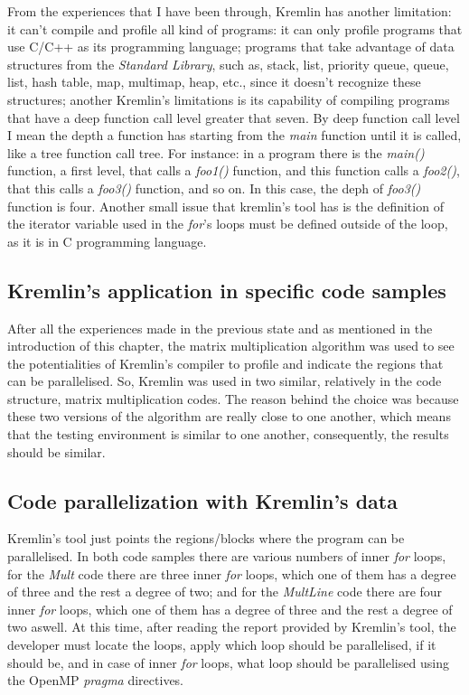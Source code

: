 From the experiences that I have been through, Kremlin has another limitation: it can't compile and profile all kind of programs: it can only profile programs that use C/C++ as its programming language; programs that take advantage of data structures from the \textit{Standard Library}, such as, stack, list, priority queue, queue, list, hash table, map, multimap, heap, etc., since it doesn't recognize these structures; another Kremlin's limitations is its capability of compiling programs that have a deep function call level greater that seven. By deep function call level I mean the depth a function has starting from the \textit{main} function until it is called, like a tree function call tree. For instance: in a program there is the \textit{main()} function, a first level, that calls a \textit{foo1()} function, and this function calls a \textit{foo2()}, that this calls a \textit{foo3()} function, and so on. In this case, the deph of \textit{foo3()} function is four. Another small issue that kremlin's tool has is the definition of the iterator variable used in the \textit{for}'s loops must be defined outside of the loop, as it is in C programming language.


\subsection{Kremlin's application in specific code samples}

After all the experiences made in the previous state and as mentioned in the introduction of this chapter, the matrix multiplication algorithm was used to see the potentialities of Kremlin's compiler to profile and indicate the regions that can be parallelised. So, Kremlin was used in two similar, relatively in the code structure, matrix multiplication codes. The reason behind the choice was because these two versions of the algorithm are really close to one another, which means that the testing environment is similar to one another, consequently, the results should be similar. 

\subsection{Code parallelization with Kremlin's data}

Kremlin's tool just points the regions/blocks where the program can be parallelised. In both code samples there are various numbers of inner \textit{for} loops, for the \textit{Mult} code  there are three inner \textit{for} loops, which one of them has a degree of three and the rest a degree of two; and for the \textit{MultLine} code there are four inner \textit{for} loops, which one of them has a degree of three and the rest a degree of two aswell. At this time, after reading the report provided by Kremlin's tool, the developer must locate the loops, apply which loop should be parallelised, if it should be, and in case of inner \textit{for} loops, what loop should be parallelised using the OpenMP \textit{pragma} directives.

